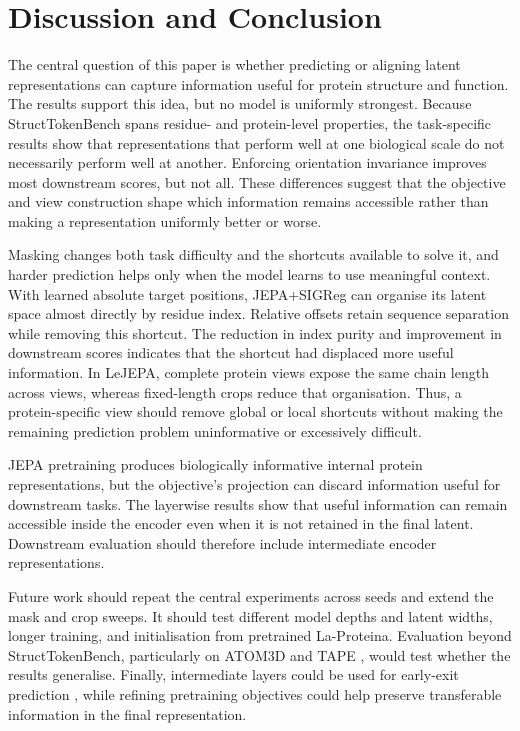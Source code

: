 \documentclass{article}
\begin{document}
\section{Discussion and Conclusion}

The central question of this paper is whether predicting or aligning latent representations can capture information useful for protein structure and function. The results support this idea, but no model is uniformly strongest. Because StructTokenBench spans residue- and protein-level properties, the task-specific results show that representations that perform well at one biological scale do not necessarily perform well at another. Enforcing orientation invariance improves most downstream scores, but not all. These differences suggest that the objective and view construction shape which information remains accessible rather than making a representation uniformly better or worse.

Masking changes both task difficulty and the shortcuts available to solve it, and harder prediction helps only when the model learns to use meaningful context. With learned absolute target positions, JEPA+SIGReg can organise its latent space almost directly by residue index. Relative offsets retain sequence separation while removing this shortcut. The reduction in index purity and improvement in downstream scores indicates that the shortcut had displaced more useful information. In LeJEPA, complete protein views expose the same chain length across views, whereas fixed-length crops reduce that organisation. Thus, a protein-specific view should remove global or local shortcuts without making the remaining prediction problem uninformative or excessively difficult.

JEPA pretraining produces biologically informative internal protein representations, but the objective's projection can discard information useful for downstream tasks. The layerwise results show that useful information can remain accessible inside the encoder even when it is not retained in the final latent. Downstream evaluation should therefore include intermediate encoder representations.

Future work should repeat the central experiments across seeds and extend the mask and crop sweeps. It should test different model depths and latent widths, longer training, and initialisation from pretrained La-Proteina. Evaluation beyond StructTokenBench, particularly on ATOM3D and TAPE \citep{townshend2020atom3d,rao2019tape}, would test whether the results generalise. Finally, intermediate layers could be used for early-exit prediction \citep{hart2026protein}, while refining pretraining objectives could help preserve transferable information in the final representation.
\end{document}
